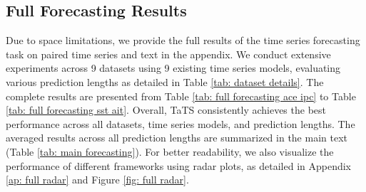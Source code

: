 \begin{figure*}[t]
\centering
\vspace{-3mm}
\caption{Comparison of different frameworks for modeling time series with paired texts. Our TaTS achieves the best performance across all datasets and is compatible with various existing time series models.}
\label{fig: full radar}
\vspace{-3mm}
\end{figure*}



\subsection{Full Forecasting Results}
\label{ap: full forecasting}
Due to space limitations, we provide the full results of the time series forecasting task on paired time series and text in the appendix. We conduct extensive experiments across 9 datasets using 9 existing time series models, evaluating various prediction lengths as detailed in Table \ref{tab: dataset details}. The complete results are presented from Table \ref{tab: full forecasting ace ipc} to Table \ref{tab: full forecasting sst ait}. Overall, TaTS consistently achieves the best performance across all datasets, time series models, and prediction lengths. The averaged results across all prediction lengths are summarized in the main text (Table \ref{tab: main forecasting}). For better readability, we also visualize the performance of different frameworks using radar plots, as detailed in Appendix \ref{ap: full radar} and Figure \ref{fig: full radar}.

